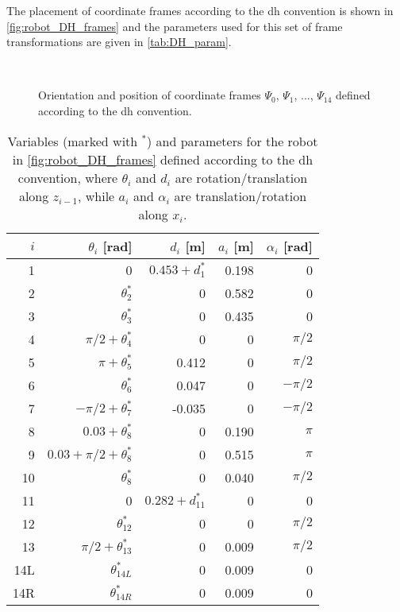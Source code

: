 The placement of coordinate frames according to the \gls{dh} convention is shown in \autoref{fig:robot_DH_frames} and the parameters used for this set of frame transformations are given in \autoref{tab:DH_param}.


\begin{figure}[htbp]
	\vspace*{-10mm}
	\hspace{-10mm}
	\vspace{5mm}\\
	\hspace*{-9mm}
	\caption{Orientation and position of coordinate frames $\Psi_0$, $\Psi_1$, ..., $\Psi_{14}$ defined according to the \gls{dh} convention.}
	\label{fig:robot_DH_frames}
\end{figure}

\begin{table}[htbp]
	\small
	\vspace*{-3mm}
	\centering
	\begin{tabular}{r | rrrr}\hline
		$i$  & $\theta_i$ [rad]& $d_i$ [m] & $a_i$ [m] & $\alpha_i$ [rad] \\\hline
		1 & 0 &  $0.453+d_1^*$ & 0.198 & 0 \\
		2 & $\theta_2^*$ & 0 & 0.582 & 0 \\
		3 & $\theta_3^*$ & 0 & 0.435 & 0\\
		4 & $\pi/2+\theta_4^*$ & 0 & 0 & $\pi/2$\\
		5 & $\pi+\theta_5^*$ & 0.412 & 0 & $\pi/2$ \\
		6 & $\theta_6^*$ & 0.047 & 0 & $-\pi/2$ \\
		7 & $-\pi/2+\theta_7^*$ & -0.035 & 0 & $-\pi/2$ \\
		8 & $0.03+\theta_8^*$ & 0 & 0.190 & $\pi$ \\
		9 & $0.03+\pi/2+\theta_8^*$ & 0 & 0.515 & $\pi$ \\
		10 & $\theta_8^*$ & 0 & 0.040 & $\pi/2$\\
		11 & 0 & $0.282+d_{11}^*$ & 0  & 0 \\
		12 & $\theta_{12}^*$ & 0 & 0 & $\pi/2$ \\
		13 & $\pi/2+\theta_{13}^*$ & 0 & 0.009 & $\pi/2$ \\
		14L & $\theta_{14L}^*$ & 0 & 0.009 & 0\\
		14R & $\theta_{14R}^*$ & 0 & 0.009 & 0 \\
	\end{tabular}
	\caption{Variables (marked with $^*$) and parameters for the robot in \autoref{fig:robot_DH_frames} defined according to the \gls{dh} convention, where $\theta_i$ and $d_i$ are rotation/translation along $z_{i-1}$, while $a_i$ and $\alpha_i$ are translation/rotation along $x_i$.}
	\label{tab:DH_param}
\end{table}


